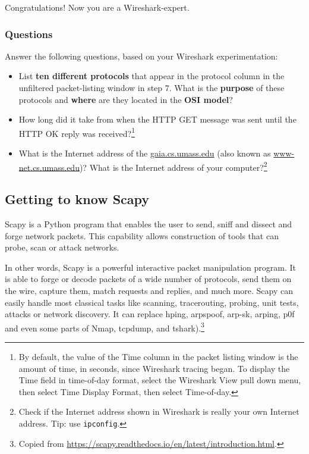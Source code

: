 \documentclass[11pt,a4paper]{article}
\begin{document}
Congratulations! Now you are a Wireshark-expert.

\subsubsection{Questions}

Answer the following questions, based on your Wireshark experimentation:
\begin{itemize}
	\item List \textbf{ten different protocols} that appear in the protocol column in the unfiltered
	packet-listing window in step 7. What is the \textbf{purpose} of these protocols and \textbf{where} are they located in the \textbf{OSI model}?

	\item How long did it take from when the HTTP GET message was sent until the HTTP
	OK reply was received?\footnote{By default, the value of the Time column in the packet listing
		window is the amount of time, in seconds, since Wireshark tracing began.
		To display the Time field in time-of-day format, select the Wireshark View pull
		down menu, then select Time Display Format, then select Time-of-day.}

	\item What is the Internet address of the \url{gaia.cs.umass.edu} (also known as \url{www-net.cs.umass.edu})? What is the Internet address of your computer?\footnote{Check if the Internet address shown in Wireshark is really your own Internet address. Tip: use \texttt{ipconfig}.}
\end{itemize}

\subsection{Getting to know Scapy}
Scapy is a Python program that enables the user to send, sniff and dissect and forge network packets. This capability allows construction of tools that can probe, scan or attack networks.

In other words, Scapy is a powerful interactive packet manipulation program. It is able to forge or decode packets of a wide number of protocols, send them on the wire, capture them, match requests and replies, and much more. Scapy can easily handle most classical tasks like scanning, tracerouting, probing, unit tests, attacks or network discovery. It can replace hping, arpspoof, arp-sk, arping, p0f and even some parts of Nmap, tcpdump, and tshark).\footnote{Copied from \url{https://scapy.readthedocs.io/en/latest/introduction.html}.}
\end{document}
